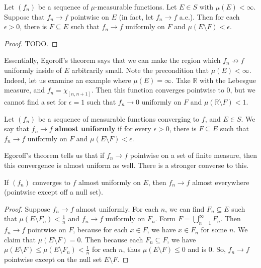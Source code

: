 	\begin{theorem}[Egoroff]
		Let $(f_n)$ be a sequence of $\mu$-measurable functions. Let $E\in S$ with $\mu(E) < \infty$. Suppose that $f_n
		\rightarrow f$ pointwise on $E$ (in fact, let $f_n\rightarrow f$ a.e.). Then for each $\epsilon > 0$, there is $F
		\subseteq E$ such that $f_n\rightarrow f$ uniformly on $F$ and $\mu(E\setminus F) < \epsilon$.
	\end{theorem}
	
	\begin{proof}
		TODO.
	\end{proof}

	Essentially, Egoroff's theorem says that we can make the region which $f_n\not\rightarrow f$ uniformly inside of $E$ 
	arbitrarily small. Note the precondition that $\mu(E) < \infty$. Indeed, let us examine an example where $\mu(E) = \infty$. 
	Take $\mathbb R$ with the Lebesgue measure, and $f_n = \chi_{[n, n + 1]}$. Then this function converges pointwise to 
	$0$, but we cannot find a set for $\epsilon = 1$ such that $f_n\rightarrow 0$ uniformly on $F$ and $\mu(\mathbb R
	\setminus F) < 1$. 
	
	\begin{definition}
		Let $(f_n)$ be a sequence of measurable functions converging to $f$, and $E\in S$. We say that $f_n\rightarrow f$ 
		\textbf{almost uniformly} if for every $\epsilon > 0$, there is $F\subseteq E$ such that $f_n\rightarrow f$ uniformly 
		on $F$ and $\mu(E\setminus F) < \epsilon$. 
	\end{definition}
	
	Egoroff's theorem tells us that if $f_n\rightarrow f$ pointwise on a set of finite measure, then this convergence is 
	almost uniform as well. There is a stronger converse to this.
	
	\begin{prop}
		If $(f_n)$ converges to $f$ almost uniformly on $E$, then $f_n\rightarrow f$ almost everywhere (pointwise except 
		off a null set). 
	\end{prop}
	
	\begin{proof}
		Suppose $f_n\rightarrow f$ almost uniformly. For each $n$, we can find $F_n\subseteq E$ such that $\mu(E
		\setminus F_n) < \frac{1}{n}$ and $f_n\rightarrow f$ uniformly on $F_n$. Form $F = \bigcup_{n = 1}^\infty F_n$. 
		Then $f_n\rightarrow f$ pointwise on $F$, because for each $x\in F$, we have $x\in F_n$ for some $n$. We 
		claim that $\mu(E\setminus F) = 0$. Then because each $F_n\subseteq F$, we have $\mu(E\setminus F)
		\leq\mu(E\setminus F_n) < \frac{1}{n}$ for each $n$, thus $\mu(E\setminus F)\leq 0$ and is 0. So, $f_n\rightarrow 
		f$ pointwise except on the null set $E\setminus F$. 
	\end{proof}
	
